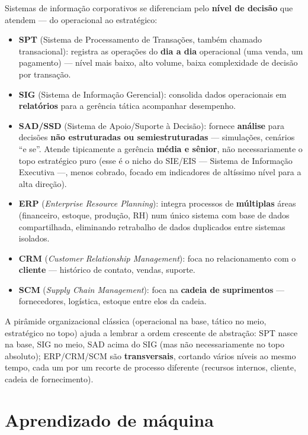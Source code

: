 \begin{conceito}
Sistemas de informação corporativos se diferenciam pelo \textbf{nível de
decisão} que atendem --- do operacional ao estratégico:
\begin{itemize}
\item \textbf{SPT} (Sistema de Processamento de Transações, também
chamado transacional): registra as operações do \textbf{dia a dia}
operacional (uma venda, um pagamento) --- nível mais baixo, alto volume,
baixa complexidade de decisão por transação.
\item \textbf{SIG} (Sistema de Informação Gerencial): consolida dados
operacionais em \textbf{relatórios} para a gerência tática acompanhar
desempenho.
\item \textbf{SAD/SSD} (Sistema de Apoio/Suporte à Decisão): fornece
\textbf{análise} para decisões \textbf{não estruturadas ou
semiestruturadas} --- simulações, cenários “e se”. Atende tipicamente a
gerência \textbf{média e sênior}, não necessariamente o topo estratégico
puro (esse é o nicho do SIE/EIS --- Sistema de Informação Executiva ---,
menos cobrado, focado em indicadores de altíssimo nível para a alta
direção).
\item \textbf{ERP} (\textit{Enterprise Resource Planning}): integra
processos de \textbf{múltiplas} áreas (financeiro, estoque, produção,
RH) num único sistema com base de dados compartilhada, eliminando
retrabalho de dados duplicados entre sistemas isolados.
\item \textbf{CRM} (\textit{Customer Relationship Management}): foca no
relacionamento com o \textbf{cliente} --- histórico de contato, vendas,
suporte.
\item \textbf{SCM} (\textit{Supply Chain Management}): foca na
\textbf{cadeia de suprimentos} --- fornecedores, logística, estoque entre
elos da cadeia.
\end{itemize}
A pirâmide organizacional clássica (operacional na base, tático no meio,
estratégico no topo) ajuda a lembrar a ordem crescente de abstração: SPT
nasce na base, SIG no meio, SAD acima do SIG (mas não necessariamente no
topo absoluto); ERP/CRM/SCM são \textbf{transversais}, cortando vários
níveis ao mesmo tempo, cada um por um recorte de processo diferente
(recursos internos, cliente, cadeia de fornecimento).
\end{conceito}

\section{Aprendizado de máquina}

